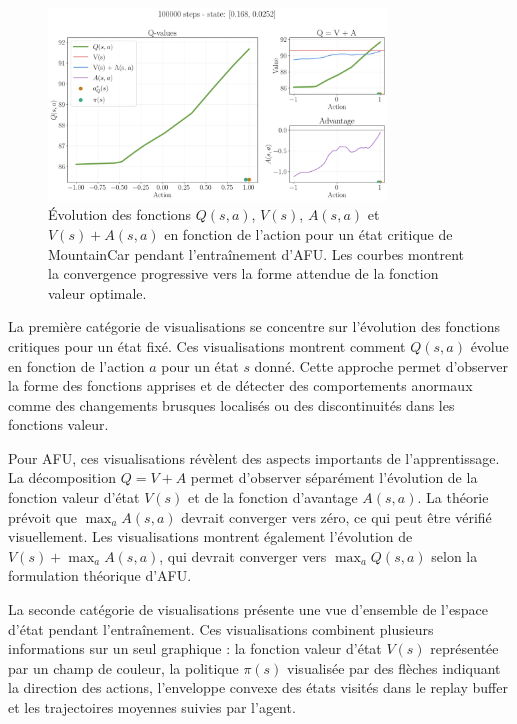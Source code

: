 \documentclass[a4paper, 12pt]{report}
\begin{document}
    \begin{figure}[htbp]
        \centering
        \includegraphics[width=0.8\textwidth]{../figures/afu_mountaincar_action_critic/scaled_02000.png}
        \caption{Évolution des fonctions $Q(s,a)$, $V(s)$, $A(s,a)$ et $V(s)+
        A(s,a)$ en fonction de l'action pour un état critique de MountainCar
        pendant l'entraînement d'AFU. Les courbes montrent la convergence
        progressive vers la forme attendue de la fonction valeur optimale.}
        \label{fig:afu-evolution}
    \end{figure}

    La première catégorie de visualisations se concentre sur l'évolution des
    fonctions critiques pour un état fixé. Ces visualisations montrent comment
    $Q(s,a)$ évolue en fonction de l'action $a$ pour un état $s$ donné. Cette
    approche permet d'observer la forme des fonctions apprises et de détecter
    des comportements anormaux comme des changements brusques localisés ou des
    discontinuités dans les fonctions valeur.

    Pour AFU, ces visualisations révèlent des aspects importants
    de l'apprentissage. La décomposition $Q=V+A$ permet d'observer séparément
    l'évolution de la fonction valeur d'état $V(s)$ et de la fonction
    d'avantage $A(s,a)$. La théorie prévoit que $\max_a A(s,a)$ devrait converger
    vers zéro, ce qui peut être vérifié visuellement. Les visualisations
    montrent également l'évolution de $V(s)+\max_a A(s,a)$, qui devrait converger
    vers $\max_a Q(s,a)$ selon la formulation théorique d'AFU.

    La seconde catégorie de visualisations présente une vue d'ensemble de
    l'espace d'état pendant l'entraînement. Ces visualisations combinent
    plusieurs informations sur un seul graphique : la fonction valeur d'état
    $V(s)$ représentée par un champ de couleur, la politique $\pi(s)$
    visualisée par des flèches indiquant la direction des actions, l'enveloppe
    convexe des états visités dans le replay buffer et les trajectoires
    moyennes suivies par l'agent.
\end{document}
